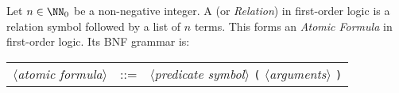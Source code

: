 \begin{definition}\label{fol-0003}%
Let $n\in\NN_{0}$ be a non-negative integer. A  (or
\emph{Relation}) in first-order logic is a relation symbol followed by a
list of $n$ terms. This forms an \textit{Atomic Formula} in first-order logic.
Its BNF grammar is:
\begin{center}
\begin{tabular}{rcl}
$\langle$\textit{atomic formula}$\rangle$ & ::= & $\langle$\textit{predicate symbol}$\rangle$ \verb#(# $\langle$\textit{arguments}$\rangle$ \verb#)#\\
\end{tabular}
\end{center}
\end{definition}
